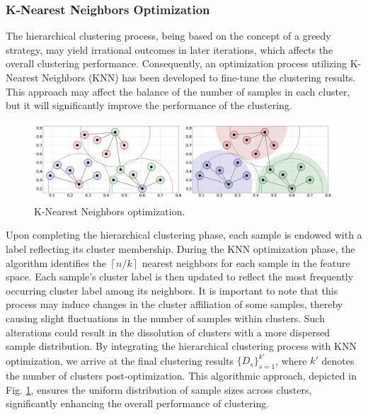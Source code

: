 \documentclass[final,3p,times]{elsarticle}
\begin{document}
\subsubsection{K-Nearest Neighbors Optimization}
The hierarchical clustering process, being based on the concept 
of a greedy strategy, may yield irrational outcomes in later 
iterations, which affects the overall clustering performance. 
Consequently, an optimization process utilizing K-Nearest 
Neighbors (KNN) has been developed to fine-tune the clustering 
results. This approach may affect the balance of the number of 
samples in each cluster, but it will significantly improve the 
performance of the clustering.

\begin{figure}[t!]
  \centering
  \includegraphics[scale=0.3]{Fig3.png}
  \caption{K-Nearest Neighbors optimization.}
  \label{Fig3}
\end{figure}

Upon completing the hierarchical clustering phase, each sample 
is endowed with a label reflecting its cluster membership. 
During the KNN optimization phase, the algorithm identifies 
the $\left\lceil n/k\right\rceil$ nearest neighbors for each 
sample in the feature space. Each sample's cluster label is then 
updated to reflect the most frequently occurring cluster label 
among its neighbors. It is important to note that this process 
may induce changes in the cluster affiliation of some samples, 
thereby causing slight fluctuations in the number of samples 
within clusters. Such alterations could result in the dissolution 
of clusters with a more dispersed sample distribution. By 
integrating the hierarchical clustering process with KNN 
optimization, we arrive at the final clustering results 
$\{D_s\}_{s=1}^{k'}$, where $k'$ denotes the number of clusters 
post-optimization. This algorithmic approach, depicted in 
Fig. \ref{Fig3}, ensures the uniform distribution of sample sizes 
across clusters, significantly enhancing the overall performance 
of clustering.
\end{document}
